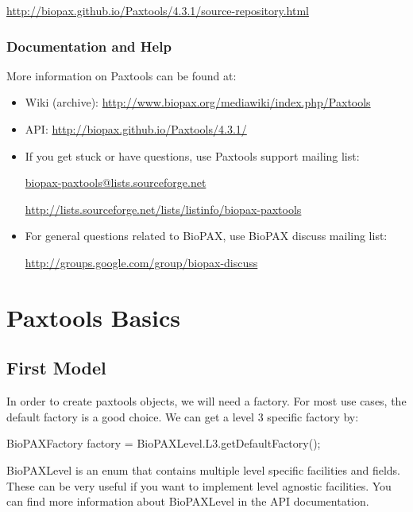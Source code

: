 \documentclass{tufte-book}
\begin{document}
\url{http://biopax.github.io/Paxtools/4.3.1/source-repository.html}

\subsection{Documentation and Help}
More information on Paxtools can be found at:
\begin{fullwidth}
\begin{itemize}
\item Wiki (archive): \url{http://www.biopax.org/mediawiki/index.php/Paxtools} 

\item API: \url{http://biopax.github.io/Paxtools/4.3.1/}

\item If you get stuck or have questions, use Paxtools support mailing list: 	

\url{biopax-paxtools@lists.sourceforge.net}

\url{http://lists.sourceforge.net/lists/listinfo/biopax-paxtools}


\item For general questions related to BioPAX, use BioPAX discuss mailing list: 

\url{http://groups.google.com/group/biopax-discuss}

\end{itemize}
\end{fullwidth}


\chapter{Paxtools Basics}

\section{First Model}

In order to create paxtools objects, we will need a factory. For most use cases, the default factory is a good choice. We can get a level 3 specific factory by:

\begin{javacode}
BioPAXFactory factory = BioPAXLevel.L3.getDefaultFactory();
\end{javacode}

BioPAXLevel is an enum that contains multiple level specific facilities and fields. These can be very useful if you want to implement level agnostic facilities. You can find more information about BioPAXLevel in the API documentation.
\end{document}
